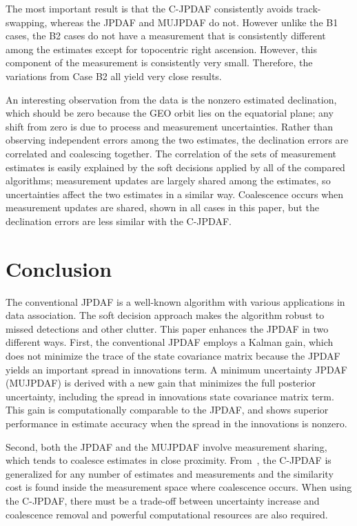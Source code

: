 \documentclass[letterpaper, paper,10pt]{AAS}		%
\begin{document}
The most important result is that the C-JPDAF consistently avoids track-swapping, whereas the JPDAF and MUJPDAF do not.
However unlike the B1 cases, the B2 cases do not have a measurement that is consistently different among the estimates except for topocentric right ascension.
However, this component of the measurement is consistently very small.
Therefore, the variations from Case B2 all yield very close results.

An interesting observation from the data is the nonzero estimated declination, which should be zero because the GEO orbit lies on the equatorial plane; any shift from zero is due to process and measurement uncertainties.
Rather than observing independent errors among the two estimates, the declination errors are correlated and coalescing together.
The correlation of the sets of measurement estimates is easily explained by the soft decisions applied by all of the compared algorithms; measurement updates are largely shared among the estimates, so uncertainties affect the two estimates in a similar way.
Coalescence occurs when measurement updates are shared, shown in all cases in this paper, but the declination errors are less similar with the C-JPDAF.





\section{Conclusion}

The conventional JPDAF is a well-known algorithm with various applications in data association.
The soft decision approach makes the algorithm robust to missed detections and other clutter.
This paper enhances the JPDAF in two different ways.
First, the conventional JPDAF employs a Kalman gain, which does not minimize the trace of the state covariance matrix because the JPDAF yields an important spread in innovations term.
A minimum uncertainty JPDAF (MUJPDAF) is derived with a new gain that minimizes the full posterior uncertainty, including the spread in innovations state covariance matrix term.
This gain is computationally comparable to the JPDAF, and shows superior performance in estimate accuracy when the spread in the innovations is nonzero.

Second, both the JPDAF and the MUJPDAF involve measurement sharing, which tends to coalesce estimates in close proximity.
From~\cite{KauLovLee14}, the C-JPDAF is generalized for any number of estimates and measurements and the similarity cost is found inside the measurement space where coalescence occurs.
When using the C-JPDAF, there must be a trade-off between uncertainty increase and coalescence removal and powerful computational resources are also required.
\end{document}
